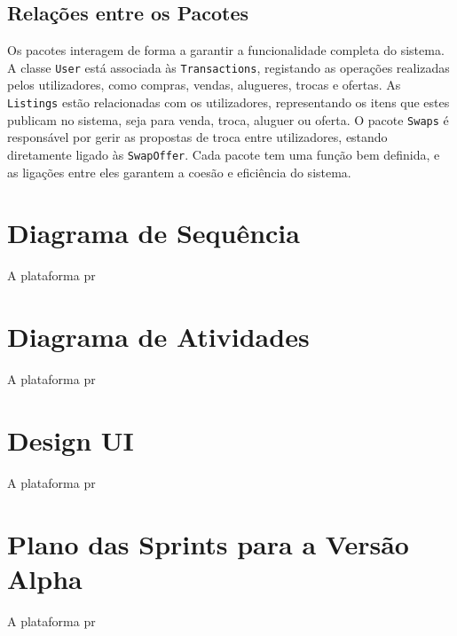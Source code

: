\documentclass[a4paper, 12pt]{article} %
\begin{document}

\subsection{Relações entre os Pacotes}

Os pacotes interagem de forma a garantir a funcionalidade completa do sistema. A classe \texttt{User} está associada às \texttt{Transactions}, registando as operações realizadas pelos utilizadores, como compras, vendas, alugueres, trocas e ofertas. As \texttt{Listings} estão relacionadas com os utilizadores, representando os itens que estes publicam no sistema, seja para venda, troca, aluguer ou oferta. O pacote \texttt{Swaps} é responsável por gerir as propostas de troca entre utilizadores, estando diretamente ligado às \texttt{SwapOffer}. Cada pacote tem uma função bem definida, e as ligações entre eles garantem a coesão e eficiência do sistema.
\newpage
\section*{Diagrama de Sequência}

A plataforma pr

\newpage
\section*{Diagrama de Atividades}

A plataforma pr

\newpage
\section*{Design UI}

A plataforma pr

\newpage
\section*{Plano das Sprints para a Versão Alpha }

A plataforma pr

\newpage
\end{document}
